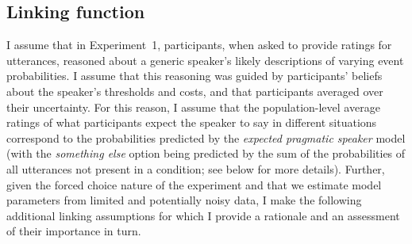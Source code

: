 \subsection{Linking function}

I assume that in Experiment~1, participants, when asked to provide ratings for utterances, reasoned about a generic speaker's 
likely descriptions of varying event probabilities. 
I assume that this reasoning was guided by participants' beliefs about the speaker's thresholds and costs, and 
that participants averaged over their uncertainty. For this reason, I assume that the population-level 
average ratings of what participants expect the speaker to say in different situations 
correspond to the probabilities predicted by the \textit{expected pragmatic speaker} model (with the \textit{something else}
option being predicted by the sum of the probabilities of all utterances not present in a condition; see below for more details).
Further, given the forced choice nature of the experiment and that we estimate model 
parameters from limited and potentially noisy data, I make the following additional linking assumptions
for which I provide a rationale and an assessment of their importance in turn.

